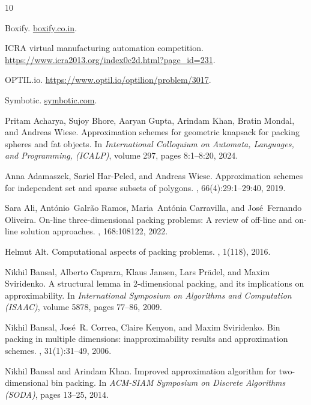 \documentclass[10pt,a4paper]{amsart}
\theoremstyle{definition}
\begin{document}
\begin{thebibliography}{10}

Boxify.
\newblock \url{boxify.co.in}.

{ICRA} virtual manufacturing automation competition.
\newblock \url{https://www.icra2013.org/index0c2d.html?page_id=231}.

{OPTIL}.io.
\newblock \url{https://www.optil.io/optilion/problem/3017}.

Symbotic.
\newblock \url{symbotic.com}.

Pritam Acharya, Sujoy Bhore, Aaryan Gupta, Arindam Khan, Bratin Mondal, and
  Andreas Wiese.
\newblock Approximation schemes for geometric knapsack for packing spheres and
  fat objects.
\newblock In {\em International Colloquium on Automata, Languages, and
  Programming, (ICALP)}, volume 297, pages 8:1--8:20, 2024.

Anna Adamaszek, Sariel Har{-}Peled, and Andreas Wiese.
\newblock Approximation schemes for independent set and sparse subsets of
  polygons.
, 66(4):29:1--29:40, 2019.

Sara Ali, Ant{\'o}nio~Galr{\~a}o Ramos, Maria~Ant{\'o}nia Carravilla, and
  Jos{\'e}~Fernando Oliveira.
\newblock On-line three-dimensional packing problems: A review of off-line and
  on-line solution approaches.
, 168:108122, 2022.

Helmut Alt.
\newblock Computational aspects of packing problems.
, 1(118), 2016.

Nikhil Bansal, Alberto Caprara, Klaus Jansen, Lars Pr{\"{a}}del, and Maxim
  Sviridenko.
\newblock A structural lemma in 2-dimensional packing, and its implications on
  approximability.
\newblock In {\em International Symposium on Algorithms and Computation
  (ISAAC)}, volume 5878, pages 77--86, 2009.

Nikhil Bansal, Jos{\'e}~R. Correa, Claire Kenyon, and Maxim Sviridenko.
\newblock Bin packing in multiple dimensions: inapproximability results and
  approximation schemes.
, 31(1):31--49, 2006.

Nikhil Bansal and Arindam Khan.
\newblock Improved approximation algorithm for two-dimensional bin packing.
\newblock In {\em ACM-SIAM Symposium on Discrete Algorithms (SODA)}, pages
  13--25, 2014.


\end{thebibliography}
\end{document}

